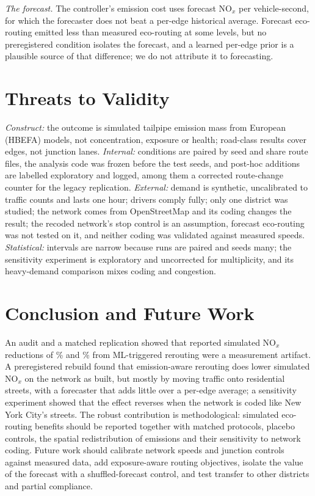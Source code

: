 \documentclass[conference]{IEEEtran}
\begin{document}
\textit{The forecast.} The controller's emission cost uses forecast NO$_x$ per vehicle-second, for which the
forecaster does not beat a per-edge historical average. Forecast eco-routing emitted less than measured eco-routing at
some levels, but no preregistered condition isolates the forecast, and a learned per-edge prior is a plausible source
of that difference; we do not attribute it to forecasting.

\section{Threats to Validity}\label{sec:threats}
\textit{Construct:} the outcome is simulated tailpipe emission mass from European (HBEFA) models, not concentration,
exposure or health; road-class results cover edges, not junction lanes. \textit{Internal:} conditions are paired by
seed and share route files, the analysis code was frozen before the test seeds, and post-hoc additions are labelled
exploratory and logged, among them a corrected route-change counter for the legacy replication. \textit{External:}
demand is synthetic, uncalibrated to traffic counts and lasts one hour; drivers comply fully; only one district was
studied; the network comes from OpenStreetMap and its coding changes the result; the recoded network's stop control
is an assumption, forecast eco-routing was not tested on it, and neither coding was validated against measured
speeds. \textit{Statistical:} intervals are narrow because runs are paired and seeds many; the sensitivity experiment
is exploratory and uncorrected for multiplicity, and its heavy-demand comparison mixes coding and congestion.

\section{Conclusion and Future Work}\label{sec:conclusion}
An audit and a matched replication showed that reported simulated NO$_x$ reductions of \LegacyNOxDropRF\% and
\LegacyNOxDropXGB\% from ML-triggered rerouting were a measurement artifact. A preregistered rebuild found that
emission-aware rerouting does lower simulated NO$_x$ on the network as built, but mostly by moving traffic onto
residential streets, with a forecaster that adds little over a per-edge average; a sensitivity experiment showed that
the effect reverses when the network is coded like New York City's streets. The robust contribution is
methodological: simulated eco-routing benefits should be reported together with matched protocols, placebo controls,
the spatial redistribution of emissions and their sensitivity to network coding. Future work should calibrate network
speeds and junction controls against measured data, add exposure-aware routing objectives, isolate the value of the
forecast with a shuffled-forecast control, and test transfer to other districts and partial compliance.
\end{document}
